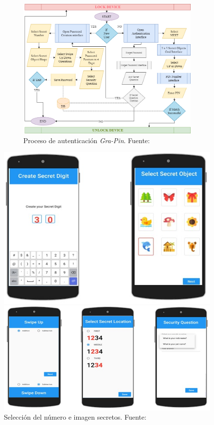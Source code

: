 \begin{anexos}
 \begin{figure}[H]
 	\begin{figure}[H]
 		\centering
 		\includegraphics[width=0.6\linewidth]{grapin-proceso.png}
 		\caption{Proceso de autenticación \textit{Gra-Pin}. Fuente: \cite{kausar2022gra} }
 		\label{gra-pin}
 	\end{figure}
	\centering
	\begin{minipage}[b]{0.4\linewidth}  %
		\centering
		\includegraphics[width=\linewidth]{grapin-secret.jpg}
		\caption{Selección del número e imagen secretos. Fuente: \cite{kausar2022gra} }
	\end{minipage}%
	\hfill
	\begin{minipage}[b]{0.5\linewidth} %
		\centering
		\includegraphics[width=\linewidth]{grapin-position.jpg}

\end{minipage}
\end{figure}
\end{anexos}
